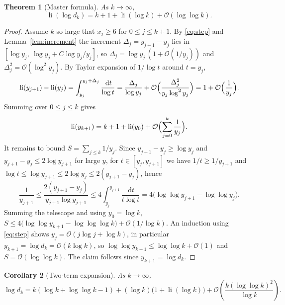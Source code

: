 \documentclass[11pt,a4paper]{article}
\theoremstyle{plain}
\newtheorem{theorem}{Theorem}[section]
\newtheorem{corollary}[theorem]{Corollary}
\theoremstyle{definition}
\newcommand{\li}{\operatorname{li}}
\newcommand{\dd}{\,\mathrm{d}}          %
\begin{document}
\begin{theorem}[Master formula]\label{thm:master}
As $k\to\infty$,
\[
  \li(\log d_k)=k+1+\li(\log k)+\mathcal{O}(\log\log k).
\]
\end{theorem}

\begin{proof}
Assume $k$ so large that $x_j\ge6$ for $0\le j\le k+1$. By
\eqref{eq:step} and Lemma~\ref{lem:increment} the increment
$\Delta_j=y_{j+1}-y_j$ lies in $[\log y_j,\ \log y_j+C\log y_j/y_j]$, so
$\Delta_j=\log y_j\,(1+\mathcal{O}(1/y_j))$ and
$\Delta_j^2=\mathcal{O}(\log^2y_j)$. By Taylor expansion of $1/\log t$
around $t=y_j$,
\[
  \li(y_{j+1})-\li(y_j)
  =\int_{y_j}^{y_j+\Delta_j}\frac{\dd t}{\log t}
  =\frac{\Delta_j}{\log y_j}
   +\mathcal{O}\Bigl(\frac{\Delta_j^2}{y_j\log^2y_j}\Bigr)
  =1+\mathcal{O}\Bigl(\frac1{y_j}\Bigr).
\]
Summing over $0\le j\le k$ gives
\[
  \li(y_{k+1})=k+1+\li(y_0)+\mathcal{O}\Bigl(\sum_{j=0}^{k}\frac1{y_j}\Bigr).
\]
It remains to bound $S=\sum_{j\le k}1/y_j$. Since $y_{j+1}-y_j\ge\log y_j$
and $y_{j+1}-y_j\le2\log y_{j+1}$ for large $y$, for $t\in[y_j,y_{j+1}]$ we
have $1/t\ge1/y_{j+1}$ and $\log t\le\log y_{j+1}\le2\log y_j\le
2(y_{j+1}-y_j)$, hence
\[
  \frac1{y_{j+1}}\le\frac{2(y_{j+1}-y_j)}{y_{j+1}\log y_{j+1}}
  \le 4\int_{y_j}^{y_{j+1}}\frac{\dd t}{t\log t}
  =4\bigl(\log\log y_{j+1}-\log\log y_j\bigr).
\]
Summing the telescope and using $y_0=\log k$,
$S\le4\bigl(\log\log y_{k+1}-\log\log\log k\bigr)+\mathcal{O}(1/\log k)$.
An induction using \eqref{eq:step} shows $y_j=\mathcal{O}(j\log j+\log k)$,
in particular $y_{k+1}=\log d_k=\mathcal{O}(k\log k)$, so
$\log\log y_{k+1}\le\log\log k+\mathcal{O}(1)$ and
$S=\mathcal{O}(\log\log k)$. The claim follows since $y_{k+1}=\log d_k$.
\end{proof}

\begin{corollary}[Two-term expansion]\label{cor:secondorder}
As $k\to\infty$,
\[
  \log d_k=k(\log k+\log\log k-1)+(\log k)\bigl(1+\li(\log k)\bigr)
  +\mathcal{O}\!\left(\frac{k(\log\log k)^2}{\log k}\right).
\]
\end{corollary}
\end{document}
